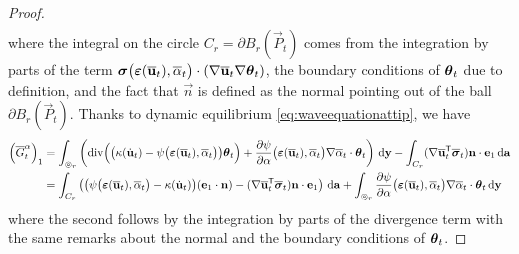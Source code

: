 \begin{proof}
\begin{multline*}
\end{multline*}
where the integral on the circle $C_r=\partial B_r(\vec{P}_t)$ comes from the integration by parts of the term $\sig\bigl(\eps(\overline{\vec{u}}_t),\overline{\alpha}_t\bigr)\cdot(\nabla\overline{\vec{u}}_t\nabla\vtheta_t)$, the boundary conditions of $\vtheta_t$ due to definition, and the fact that $\vec{n}$ is defined as the normal pointing out of the ball $\partial B_r(\vec{P}_t)$. Thanks to dynamic equilibrium \eqref{eq:waveequationattip}, we have
\begin{align*}
\left(\overline{G}^\alpha_t\right)_1 &= \int_{\circledcirc_r}\left(\div\Bigl(\bigl(\kappa(\dot{\vec{u}}_t)-\psi\bigl(\eps(\overline{\vec{u}}_t),\overline{\alpha}_t\bigr)\bigr)\vtheta_t\Bigr)+\frac{\partial\psi}{\partial\alpha}\bigl(\eps(\overline{\vec{u}}_t),\overline{\alpha}_t\bigr)\nabla\overline{\alpha}_t\cdot\vtheta_t\right)\D{\vec{y}}-\int_{C_r}(\nabla\overline{\vec{u}}_t^\mT\overline{\sig}_t)\vec{n}\cdot\vec{e}_1\D{\vec{a}} \\
&= \int_{C_r}\left(\bigl(\psi\bigl(\eps(\overline{\vec{u}}_t),\overline{\alpha}_t\bigr)-\kappa(\dot{\vec{u}}_t)\bigr)(\vec{e}_1\cdot\vec{n})-(\nabla\overline{\vec{u}}_t^\mT\overline{\sig}_t)\vec{n}\cdot\vec{e}_1\right)\D{\vec{a}}+\int_{\circledcirc_r}\frac{\partial\psi}{\partial\alpha}\bigl(\eps(\overline{\vec{u}}_t),\overline{\alpha}_t\bigr)\nabla\overline{\alpha}_t\cdot\vtheta_t\D{\vec{y}}
\end{align*}
where the second follows by the integration by parts of the divergence term with the same remarks about the normal and the boundary conditions of $\vtheta_t$.


\end{proof}
